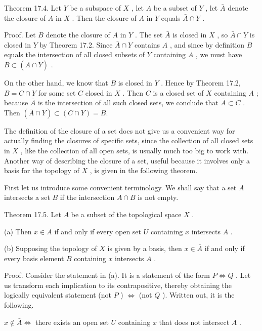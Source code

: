 Theorem 17.4. Let \(Y\) be a subspace of \(X\) , let \(A\) be a subset of \(Y\) , let \(\bar{A}\) denote the closure of \(A\) in \(X\) . Then the closure of \(A\) in \(Y\) equals \(\bar{A} \cap  Y\) .

Proof. Let \(B\) denote the closure of \(A\) in \(Y\) . The set \(\bar{A}\) is closed in \(X\) , so \(\bar{A} \cap  Y\) is closed in \(Y\) by Theorem 17.2. Since \(\bar{A} \cap  Y\) contains \(A\) , and since by definition \(B\) equals the intersection of all closed subsets of \(Y\) containing \(A\) , we must have \(B \subset  \left( {\bar{A} \cap  Y}\right)\) .

On the other hand, we know that \(B\) is closed in \(Y\) . Hence by Theorem 17.2, \(B = C \cap  Y\) for some set \(C\) closed in \(X\) . Then \(C\) is a closed set of \(X\) containing \(A\) ; because \(\bar{A}\) is the intersection of all such closed sets, we conclude that \(\bar{A} \subset  C\) . Then \(\left( {\bar{A} \cap  Y}\right)  \subset  \left( {C \cap  Y}\right)  = B.\)

The definition of the closure of a set does not give us a convenient way for actually finding the closures of specific sets, since the collection of all closed sets in \(X\) , like the collection of all open sets, is usually much too big to work with. Another way of describing the closure of a set, useful because it involves only a basis for the topology of \(X\) , is given in the following theorem.

First let us introduce some convenient terminology. We shall say that a set \(A\) intersects a set \(B\) if the intersection \(A \cap  B\) is not empty.

Theorem 17.5. Let \(A\) be a subset of the topological space \(X\) .

(a) Then \(x \in  \bar{A}\) if and only if every open set \(U\) containing \(x\) intersects \(A\) .

(b) Supposing the topology of \(X\) is given by a basis, then \(x \in  \bar{A}\) if and only if every basis element \(B\) containing \(x\) intersects \(A\) .

Proof. Consider the statement in (a). It is a statement of the form \(P \Leftrightarrow  Q\) . Let us transform each implication to its contrapositive, thereby obtaining the logically equivalent statement (not \(P\) ) \(\Leftrightarrow\) (not \(Q\) ). Written out, it is the following.

\(x \notin  \bar{A} \Leftrightarrow\) there exists an open set \(U\) containing \(x\) that does not intersect \(A\) .

